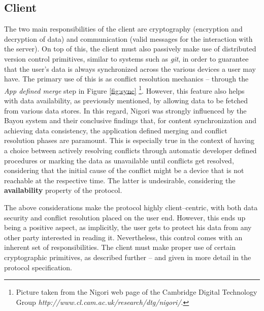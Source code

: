 \subsection{Client}
The two main responsibilities of the client are cryptography (encryption and decryption of data) and communication (valid messages for the interaction with the server).
On top of this, the client must also passively make use of distributed version control primitives, similar to systems such as \textit{git}, in order to guarantee that the user's data is always synchronized across the various devices a user may have.
The primary use of this is as conflict resolution mechanics -- through the \textit{App defined merge} step in Figure \ref{fig:sync} \footnote{Picture taken from the Nigori web page of the Cambridge Digital Technology Group \textit{http://www.cl.cam.ac.uk/research/dtg/nigori/}.}.
However, this feature also helps with data availability, as previously mentioned, by allowing data to be fetched from various data stores.
In this regard, Nigori was strongly influenced by the Bayou system \cite{Bayou} and their conclusive findings that, for content synchronization and achieving data consistency, the application defined merging and conflict resolution phases are paramount.
This is especially true in the context of having a choice between actively resolving conflicts through automatic developer defined procedures or marking the data as unavailable until conflicts get resolved, considering that the initial cause of the conflict might be a device that is not reachable at the respective time.
The latter is undesirable, considering the \textbf{availability} property of the protocol.


The above considerations make the protocol highly client--centric, with both data security and conflict resolution placed on the user end.
However, this ends up being a positive aspect, as implicitly, the user gets to protect his data from any other party interested in reading it.
Nevertheless, this control comes with an inherent set of responsibilities.
The client must make proper use of certain cryptographic primitives, as described further -- and given in more detail in the protocol specification.

